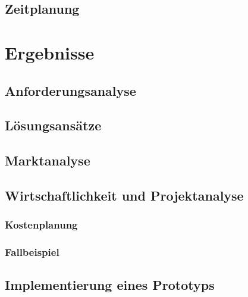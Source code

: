 \documentclass[a4paper, 12pt, oneside]{scrbook}
\begin{document}
	\section{Zeitplanung}
	
\chapter{Ergebnisse}
	
	
	\section{Anforderungsanalyse}
	
	\section{Lösungsansätze}
		
	
	\section{Marktanalyse}
	
	
	\section{Wirtschaftlichkeit und Projektanalyse}
	
		\subsection{Kostenplanung}
		
		\subsection{Fallbeispiel}
	
	\section{Implementierung eines Prototyps}
	
\end{document}
